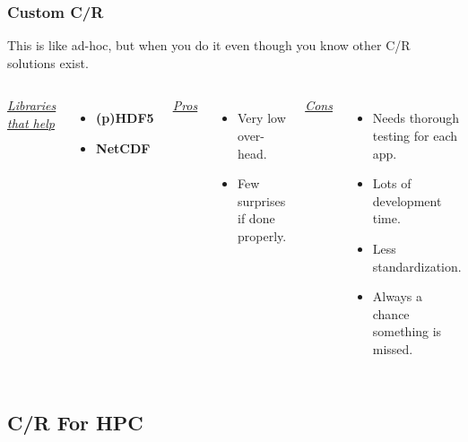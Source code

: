 \documentclass[compress]{beamer}
\begin{document}
\begin{frame}
\frametitle{Custom C/R}

This is like ad-hoc, but when you do it even though you know
other C/R solutions exist.
\begin{columns}[t]
\ul{\textit{Libraries that help}}
\begin{itemize}
\item \textbf{(p)HDF5}
\item \textbf{NetCDF}
\end{itemize}

\ul{\textit{Pros}}
\begin{itemize}
\item Very low over-head.
\item Few surprises if done properly.
\end{itemize}

\ul{\textit{Cons}}
\begin{itemize}
\item Needs thorough testing for each app.
\item Lots of development time.
\item Less standardization.
\item Always a chance something is missed.
\end{itemize}

\end{columns}


\end{frame}



\subsection{C/R For HPC}      %

\end{document}
